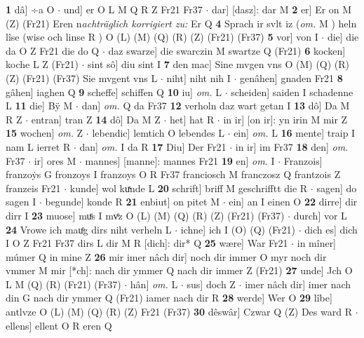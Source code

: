 \documentclass[8pt,a4paper,notitlepage]{article}
\begin{document}
\begin{table}[ht]
\begin{minipage}[t]{0.5\linewidth}
\textbf{1} dâ] ÷a O  $\cdot$ und] er O L M Q R Z Fr21 Fr37  $\cdot$ dar] [dasz]: dar M \textbf{2} er] Er on M (Z) (Fr21) Eren n\textit{achträglich korrigiert zu: }Er Q \textbf{4} Sprach ir svlt iz (\textit{om.} M ) heln lîse (wise och linse R ) O (L) (M) (Q) (R) (Z) (Fr21) (Fr37) \textbf{5} vor] von I  $\cdot$ die] die da O Z Fr21 die do Q  $\cdot$ daz swarze] die swarczin M swartze Q (Fr21) \textbf{6} kocken] koche L Z (Fr21)  $\cdot$ sint sô] diu sint I \textbf{7} den mac] Sine mvgen vns O (M) (Q) (R) (Z) (Fr21) (Fr37) Sie mvgent vns L  $\cdot$ niht] niht nih I  $\cdot$ genâhen] gnaden Fr21 \textbf{8} gâhen] iaghen Q \textbf{9} scheffe] schiffen Q \textbf{10} iu] \textit{om.} L  $\cdot$ scheiden] saiden I schadenne L \textbf{11} die] Bÿ M  $\cdot$ dan] \textit{om.} Q da Fr37 \textbf{12} verholn daz wart getan I \textbf{13} dô] Da M R Z  $\cdot$ entran] tran Z \textbf{14} dô] Da M Z  $\cdot$ het] hat R  $\cdot$ in ir] [on ir]: yn irin M mir Z \textbf{15} wochen] \textit{om.} Z  $\cdot$ lebendic] lemtich O lebendes L  $\cdot$ ein] \textit{om.} L \textbf{16} mente] traip I nam L ierret R  $\cdot$ dan] \textit{om.} I da R \textbf{17} Diu] Der Fr21  $\cdot$ in ir] im Fr37 \textbf{18} den] \textit{om.} Fr37  $\cdot$ ir] ores M  $\cdot$ mannes] [manne]: mannes Fr21 \textbf{19} en] \textit{om.} I  $\cdot$ Franzois] franzoẏs G fronzoys I franzoys O R Fr37 franciosch M franczosz Q frantzois Z franzeis Fr21  $\cdot$ kunde] wol kuͯnde L \textbf{20} schrift] briff M geschrifftt die R  $\cdot$ sagen] do sagen I  $\cdot$ begunde] konde R \textbf{21} enbiut] on pitet M  $\cdot$ ein] an I einen O \textbf{22} dirre] dir dirr I \textbf{23} muose] muͤs I mvͦz O (L) (M) (Q) (R) (Z) (Fr21) (Fr37)  $\cdot$ durch] vor L \textbf{24} Vrowe ich mauͦg dirs niht verheln L  $\cdot$ ichne] ich I (O) (Q) (Fr21)  $\cdot$ dich es] dich I O Z Fr21 Fr37 dirs L dir M R [dich]: dir* Q \textbf{25} wære] War Fr21  $\cdot$ in mîner] múmer Q in mine Z \textbf{26} mir imer nâch dir] noch dir immer O myr noch dir vmmer M mir [*ch]: nach dir ymmer Q nach dir immer Z (Fr21) \textbf{27} unde] Jch O L M (Q) (R) (Fr21) (Fr37)  $\cdot$ hân] \textit{om.} L  $\cdot$ sus] doch Z  $\cdot$ imer nâch dir] imer nach din G nach dir ymmer Q (Fr21) iamer nach dir R \textbf{28} werde] Wer O \textbf{29} lîbe] antlvze O (L) (M) (Q) (R) (Z) Fr21 (Fr37) \textbf{30} dêswâr] Czwar Q (Z) Des ward R  $\cdot$ ellens] ellent O R eren Q \newline
\end{minipage}
\hspace{0.5cm}
\begin{minipage}[t]{0.5\linewidth}

\end{minipage}
\end{table}
\end{document}
